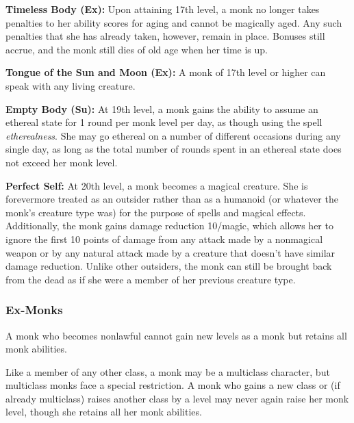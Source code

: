 \documentclass{article}
\begin{document}
\textbf{Timeless Body (Ex):} Upon attaining 17th level, a monk no longer takes 
penalties to her ability scores for aging and cannot be magically aged. Any such 
penalties that she has already taken, however, remain in place. Bonuses still accrue, 
and the monk still dies of old age when her time is up.

\textbf{Tongue of the Sun and Moon (Ex): }A monk of 17th level or higher can speak 
with any living creature.

\textbf{Empty Body (Su):} At 19th level, a monk gains the ability to assume an 
ethereal state for 1 round per monk level per day, as though using the spell \textit{etherealness}. 
She may go ethereal on a number of different occasions during any single day, as 
long as the total number of rounds spent in an ethereal state does not exceed her 
monk level.

\textbf{Perfect Self:} At 20th level, a monk becomes a magical creature. She is 
forevermore treated as an outsider rather than as a humanoid (or whatever the monk's 
creature type was) for the purpose of spells and magical effects. Additionally, 
the monk gains damage reduction 10/magic, which allows her to ignore the first 
10 points of damage from any attack made by a nonmagical weapon or by any natural 
attack made by a creature that doesn't have similar damage reduction. Unlike other 
outsiders, the monk can still be brought back from the dead as if she were a member 
of her previous creature type.

\vspace{12pt}
\subsubsection*{\textbf{Ex-Monks}}

A monk who becomes nonlawful cannot gain new levels as a monk but retains all monk 
abilities.

Like a member of any other class, a monk may be a multiclass character, but multiclass 
monks face a special restriction. A monk who gains a new class or (if already multiclass) 
raises another class by a level may never again raise her monk level, though she 
retains all her monk abilities.

\newpage
\end{document}
